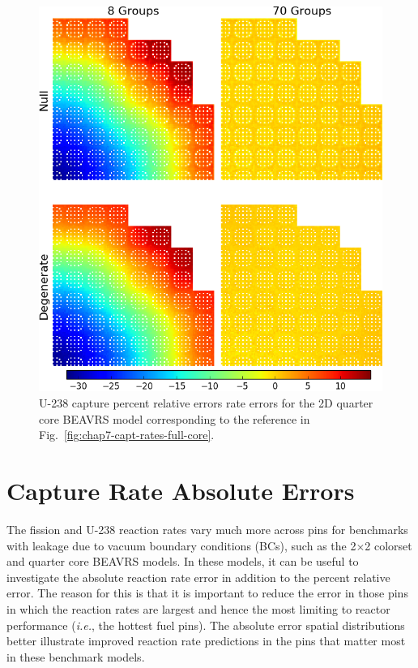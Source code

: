 \begin{appendices}
\begin{figure}[h!]
\centering
\includegraphics[width=\linewidth]{figures/quantification/appendix/full-core/capt-err}
\vspace{2mm}
\caption[U-238 capture rate errors for BEAVRS]{U-238 capture percent relative errors rate errors for the 2D quarter core \ac{BEAVRS} model corresponding to the reference in Fig.~\ref{fig:chap7-capt-rates-full-core}.}
\label{fig:quantify-full-core-capt-err}
\end{figure}

\clearpage

\section{Capture Rate Absolute Errors}
\label{sec:quantify-capt-rates-absolute}

The fission and U-238 reaction rates vary much more across pins for benchmarks with leakage due to vacuum boundary conditions (BCs), such as the 2$\times$2 colorset and quarter core \ac{BEAVRS} models. In these models, it can be useful to investigate the absolute reaction rate error in addition to the percent relative error. The reason for this is that it is important to reduce the error in those pins in which the reaction rates are largest and hence the most limiting to reactor performance (\textit{i.e.}, the hottest fuel pins). The absolute error spatial distributions better illustrate improved reaction rate predictions in the pins that matter most in these benchmark models.


\end{appendices}
